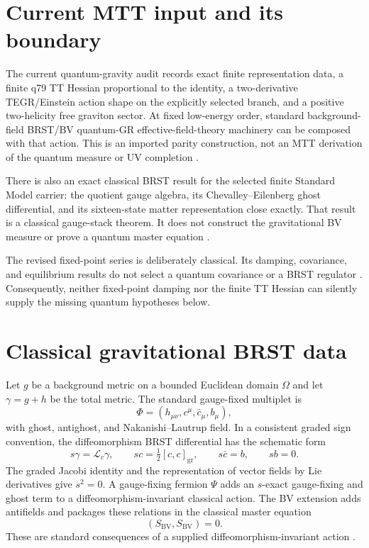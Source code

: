 \documentclass[11pt]{article}
\newcommand{\Om}{\Omega}
\newcommand{\BV}{\mathrm{BV}}
\newcommand{\sop}{s}
\begin{document}
\section{Current MTT input and its boundary}

The current quantum-gravity audit records exact finite representation data, a
finite q79 TT Hessian proportional to the identity, a two-derivative
TEGR/Einstein action shape on the explicitly selected branch, and a positive
two-helicity free graviton sector.  At fixed low-energy order, standard
background-field BRST/BV quantum-GR effective-field-theory machinery can be
composed with that action.  This is an imported parity construction, not an
MTT derivation of the quantum measure or UV completion
\cite{MTTQGAudit,Donoghue2012}.

There is also an exact classical BRST result for the selected finite Standard
Model carrier: the quotient gauge algebra, its Chevalley--Eilenberg ghost
differential, and its sixteen-state matter representation close exactly.  That
result is a classical gauge-stack theorem.  It does not construct the
gravitational BV measure or prove a quantum master equation
\cite{MTTSMBRST}.

The revised fixed-point series is deliberately classical.  Its damping,
covariance, and equilibrium results do not select a quantum covariance or a
BRST regulator \cite{FPVI}.  Consequently, neither fixed-point damping nor the
finite TT Hessian can silently supply the missing quantum hypotheses below.

\section{Classical gravitational BRST data}

Let $g$ be a background metric on a bounded Euclidean domain $\Om$ and let
$\gamma=g+h$ be the total metric.  The standard gauge-fixed multiplet is
\[
 \Phi=(h_{\mu\nu},c^\mu,\bar c_\mu,b_\mu),
\]
with ghost, antighost, and Nakanishi--Lautrup field.  In a consistent graded
sign convention, the diffeomorphism BRST differential has the schematic form
\[
 \sop\gamma=\mathcal L_c\gamma,
 \qquad
 \sop c=\tfrac12[c,c]_{\mathrm{gr}},
 \qquad
 \sop\bar c=b,
 \qquad
 \sop b=0.
\]
The graded Jacobi identity and the representation of vector fields by Lie
derivatives give $\sop^2=0$.  A gauge-fixing fermion $\Psi$ adds an
$\sop$-exact gauge-fixing and ghost term to a diffeomorphism-invariant
classical action.  The BV extension adds antifields and packages these
relations in the classical master equation
\[
 (S_{\BV},S_{\BV})=0.
\]
These are standard consequences of a supplied diffeomorphism-invariant action
\cite{BatalinVilkovisky1981,HenneauxTeitelboim1992,BarnichBrandtHenneaux2000}.
\end{document}
